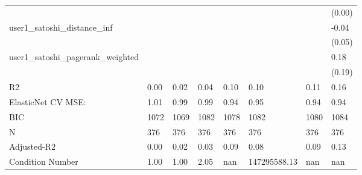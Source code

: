\begin{table}
\begin{center}
\begin{tabular}{llllllll}
                                                 &          &            &         &         &              &                    & (0.00)    \\
user1_satoshi_distance_inf                       &          &            &         &         &              &                    & -0.04     \\
                                                 &          &            &         &         &              &                    & (0.05)    \\
user1_satoshi_pagerank_weighted                  &          &            &         &         &              &                    & 0.18      \\
                                                 &          &            &         &         &              &                    & (0.19)    \\
R2                                               & 0.00     & 0.02       & 0.04    & 0.10    & 0.10         & 0.11               & 0.16      \\
ElasticNet CV MSE:                               & 1.01     & 0.99       & 0.99    & 0.94    & 0.95         & 0.94               & 0.94      \\
BIC                                              & 1072     & 1069       & 1082    & 1078    & 1082         & 1080               & 1084      \\
N                                                & 376      & 376        & 376     & 376     & 376          & 376                & 376       \\
Adjusted-R2                                      & 0.00     & 0.02       & 0.03    & 0.09    & 0.08         & 0.09               & 0.13      \\
Condition Number                                 & 1.00     & 1.00       & 2.05    & nan     & 147295588.13 & nan                & nan       \\
\hline
\end{tabular}
\end{center}
\end{table}